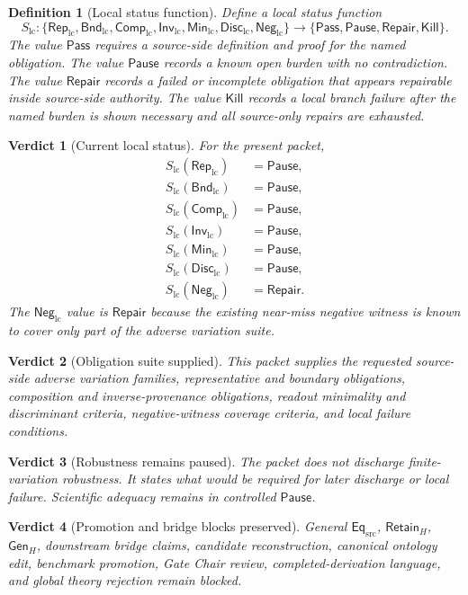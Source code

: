 \documentclass[11pt]{article}
\newcommand{\EqSrc}{\mathsf{Eq}_{\mathrm{src}}}
\newcommand{\RepLC}{\mathsf{Rep}_{\mathrm{lc}}}
\newcommand{\BndLC}{\mathsf{Bnd}_{\mathrm{lc}}}
\newcommand{\CompLC}{\mathsf{Comp}_{\mathrm{lc}}}
\newcommand{\InvLC}{\mathsf{Inv}_{\mathrm{lc}}}
\newcommand{\MinLC}{\mathsf{Min}_{\mathrm{lc}}}
\newcommand{\DiscLC}{\mathsf{Disc}_{\mathrm{lc}}}
\newcommand{\NegLC}{\mathsf{Neg}_{\mathrm{lc}}}
\newcommand{\RetainH}{\mathsf{Retain}_{H}}
\newcommand{\GenH}{\mathsf{Gen}_{H}}
\newcommand{\Pass}{\mathsf{Pass}}
\newcommand{\Pause}{\mathsf{Pause}}
\newcommand{\Repair}{\mathsf{Repair}}
\newcommand{\Kill}{\mathsf{Kill}}
\newtheorem{definition}{Definition}
\newtheorem{verdict}{Verdict}
\begin{document}
\begin{definition}[Local status function]
Define a local status function
\[
S_{\mathrm{lc}}:
\{\RepLC,\BndLC,\CompLC,\InvLC,\MinLC,\DiscLC,\NegLC\}
\longrightarrow
\{\Pass,\Pause,\Repair,\Kill\}.
\]
The value \(\Pass\) requires a source-side definition and proof for the
named obligation. The value \(\Pause\) records a known open burden with
no contradiction. The value \(\Repair\) records a failed or incomplete
obligation that appears repairable inside source-side authority. The
value \(\Kill\) records a local branch failure after the named burden is
shown necessary and all source-only repairs are exhausted.
\end{definition}

\begin{verdict}[Current local status]
For the present packet,
\[
\begin{aligned}
S_{\mathrm{lc}}(\RepLC)&=\Pause,\\
S_{\mathrm{lc}}(\BndLC)&=\Pause,\\
S_{\mathrm{lc}}(\CompLC)&=\Pause,\\
S_{\mathrm{lc}}(\InvLC)&=\Pause,\\
S_{\mathrm{lc}}(\MinLC)&=\Pause,\\
S_{\mathrm{lc}}(\DiscLC)&=\Pause,\\
S_{\mathrm{lc}}(\NegLC)&=\Repair.
\end{aligned}
\]
The \(\NegLC\) value is \(\Repair\) because the existing near-miss
negative witness is known to cover only part of the adverse variation
suite.
\end{verdict}

\begin{verdict}[Obligation suite supplied]
This packet supplies the requested source-side adverse variation
families, representative and boundary obligations, composition and
inverse-provenance obligations, readout minimality and discriminant
criteria, negative-witness coverage criteria, and local failure
conditions.
\end{verdict}

\begin{verdict}[Robustness remains paused]
The packet does not discharge finite-variation robustness. It states
what would be required for later discharge or local failure. Scientific
adequacy remains in controlled \(\Pause\).
\end{verdict}

\begin{verdict}[Promotion and bridge blocks preserved]
General \(\EqSrc\), \(\RetainH\), \(\GenH\), downstream bridge claims,
candidate reconstruction, canonical ontology edit, benchmark
promotion, Gate Chair review, completed-derivation language, and global
theory rejection remain blocked.
\end{verdict}
\end{document}
